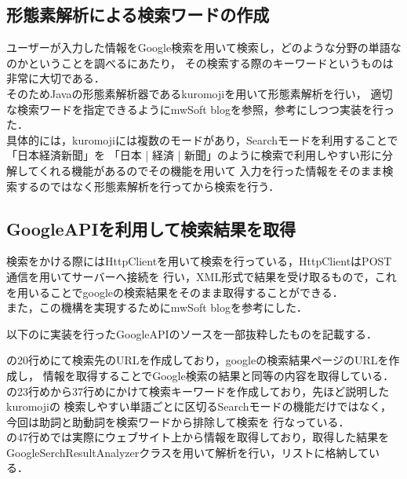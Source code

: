 \subsection{形態素解析による検索ワードの作成}
ユーザーが入力した情報をGoogle検索を用いて検索し，どのような分野の単語なのかということを調べるにあたり，
その検索する際のキーワードというものは非常に大切である．\\

そのためJavaの形態素解析器であるkuromoji\cite{gitkuromoji}を用いて形態素解析を行い，
適切な検索ワードを指定できるようにmwSoft blog\cite{kuromoji}を参照，参考にしつつ実装を行った．\\

具体的には，kuromojiには複数のモードがあり，Searchモードを利用することで「日本経済新聞」を
「日本 | 経済 | 新聞」のように検索で利用しやすい形に分解してくれる機能があるのでその機能を用いて
入力を行った情報をそのまま検索するのではなく形態素解析を行ってから検索を行う．\\



\subsection{GoogleAPIを利用して検索結果を取得}
検索をかける際にはHttpClientを用いて検索を行っている，HttpClientはPOST通信を用いてサーバーへ接続を
行い，XML形式で結果を受け取るもので，これを用いることでgoogleの検索結果をそのまま取得することができる．\\
また，この機構を実現するためにmwSoft blog\cite{google}を参考にした．

以下のに実装を行ったGoogleAPIのソースを一部抜粋したものを記載する．

の20行めにて検索先のURLを作成しており，googleの検索結果ページのURLを作成し，
情報を取得することでGoogle検索の結果と同等の内容を取得している．\\

の23行めから37行めにかけて検索キーワードを作成しており，先ほど説明したkuromojiの
検索しやすい単語ごとに区切るSearchモードの機能だけではなく，今回は助詞と助動詞を検索ワードから排除して検索を
行なっている．\\

の47行めでは実際にウェブサイト上から情報を取得しており，取得した結果を
GoogleSerchResultAnalyzerクラスを用いて解析を行い，リストに格納している．\\



